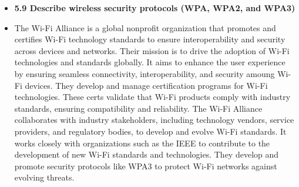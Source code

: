 \documentclass{article}
\begin{document}
\begin{itemize}
  \item \textbf{5.9 Describe wireless security protocols (WPA, WPA2, and WPA3)}
  	\item[] The Wi-Fi Alliance is a global nonprofit organization that promotes and certifies Wi-Fi technology standards to ensure interoperability and security across devices and networks. Their mission is to drive the adoption of Wi-Fi technologies and standards globally. It aims to enhance the user experience by ensuring seamless connectivity, interoperability, and security amoung Wi-Fi devices. They develop and manage certification programs for Wi-Fi technologies. These certs validate that Wi-Fi products comply with industry standards, ensuring compatibility and reliability. The Wi-Fi Alliance collaborates with industry stakeholders, including technology vendors, service providers, and regulatory bodies, to develop and evolve Wi-Fi standards. It works closely with organizations such as the IEEE to contribute to the development of new Wi-Fi standards and technologies. They develop and promote security protocols like WPA3 to protect Wi-Fi networks against evolving threats.


\end{itemize}
\end{document}
